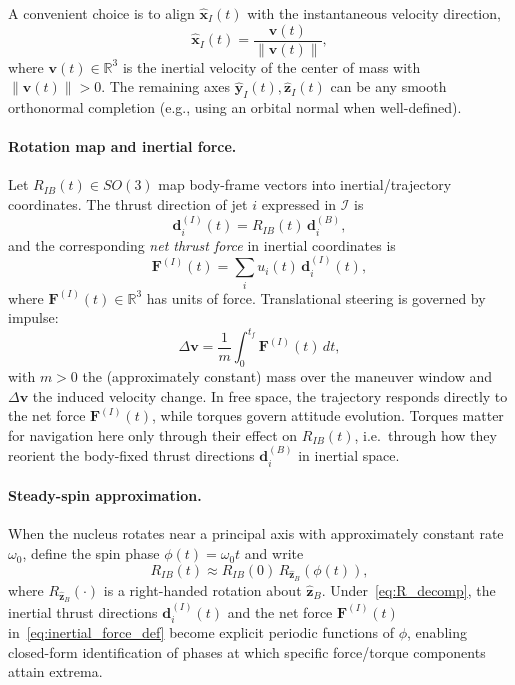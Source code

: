 \documentclass{article}
\begin{document}
A convenient choice is to align $\hat{\mathbf x}_I(t)$ with the instantaneous velocity direction,
\begin{equation}
\hat{\mathbf x}_I(t)=\frac{\mathbf v(t)}{\|\mathbf v(t)\|},
\end{equation}
where $\mathbf v(t)\in\mathbb R^3$ is the inertial velocity of the center of mass with $\|\mathbf v(t)\|>0$.
The remaining axes $\hat{\mathbf y}_I(t),\hat{\mathbf z}_I(t)$ can be any smooth
orthonormal completion (e.g., using an orbital normal when well-defined).

\paragraph{Rotation map and inertial force.}
Let $R_{IB}(t)\in SO(3)$ map body-frame vectors into inertial/trajectory coordinates. The thrust direction
of jet $i$ expressed in $\mathcal I$ is
\begin{equation}
\mathbf d_i^{(I)}(t)=R_{IB}(t)\,\mathbf d_i^{(B)},
\end{equation}
and the corresponding \emph{net thrust force} in inertial coordinates is
\begin{equation}
\mathbf F^{(I)}(t)=\sum_i u_i(t)\,\mathbf d_i^{(I)}(t),
\label{eq:inertial_force_def}
\end{equation}
where $\mathbf F^{(I)}(t)\in\mathbb R^3$ has units of force. Translational steering is governed by impulse:
\begin{equation}
\Delta \mathbf v=\frac{1}{m}\int_0^{t_f}\mathbf F^{(I)}(t)\,dt,
\label{eq:impulse_dv}
\end{equation}
with $m>0$ the (approximately constant) mass over the maneuver window and $\Delta \mathbf v$ the induced velocity change.
In free space, the trajectory responds directly to the net force $\mathbf F^{(I)}(t)$, while torques govern
attitude evolution. Torques matter for navigation here only through their effect on $R_{IB}(t)$, i.e.\ through how
they reorient the body-fixed thrust directions $\mathbf d_i^{(B)}$ in inertial space.

\paragraph{Steady-spin approximation.}
When the nucleus rotates near a principal axis with approximately constant rate $\omega_0$, define the spin phase
$\phi(t)=\omega_0 t$ and write
\begin{equation}
R_{IB}(t)\approx R_{IB}(0)\,R_{\hat{\mathbf z}_B}(\phi(t)),
\label{eq:R_decomp}
\end{equation}
where $R_{\hat{\mathbf z}_B}(\cdot)$ is a right-handed rotation about $\hat{\mathbf z}_B$. Under~\eqref{eq:R_decomp},
the inertial thrust directions $\mathbf d_i^{(I)}(t)$ and the net force $\mathbf F^{(I)}(t)$ in~\eqref{eq:inertial_force_def}
become explicit periodic functions of $\phi$, enabling closed-form identification of phases at which specific force/torque
components attain extrema.
\end{document}

